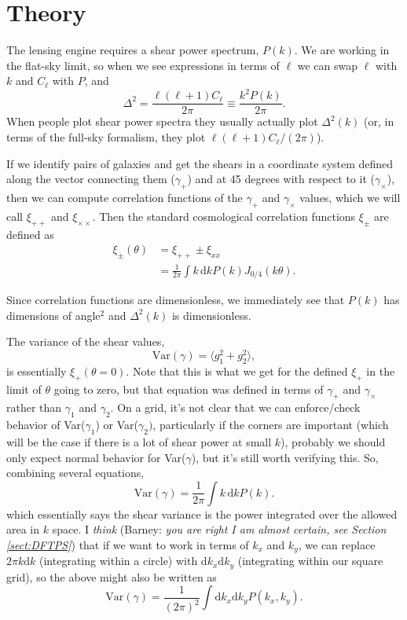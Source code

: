 \documentclass[preprint]{aastex}
\newcommand{\rmd}{\ensuremath{\mathrm{d}}}
\newcommand{\beq}{\begin{equation}}
\newcommand{\eeq}{\end{equation}}
\begin{document}
\section{Theory}\label{sect:theory}

The lensing engine requires a shear power spectrum, $P(k)$.  We are
working in the flat-sky limit, so when we see expressions in terms of
$\ell$ we can swap $\ell$ with $k$ and $C_\ell$ with $P$, and
\beq
\Delta^2 = \frac{\ell(\ell+1) C_{\ell}}{2\pi}\equiv \frac{k^2 P(k)}{2\pi}.
\eeq
When people plot shear power spectra they usually actually plot
$\Delta^2(k)$ (or, in terms of the full-sky formalism, they plot $\ell(\ell+1)C_\ell/(2\pi)$).

If we identify pairs of galaxies and get the shears in a coordinate
system defined along the vector connecting them ($\gamma_+$) and at 45
degrees with respect to it ($\gamma_\times$), then we can compute
correlation functions of the $\gamma_+$ and $\gamma_\times$ values,
which we will call $\xi_{++}$ and $\xi_{\times\times}$.  Then the
standard cosmological correlation functions $\xi_{\pm}$ are defined as
\begin{align}
\xi_{\pm}(\theta) &=  \xi_{++}\pm \xi_{xx} \\
 &= \frac{1}{2\pi}\int k\,\rmd k P(k) J_{0/4}(k\theta).  \label{eq:xi}
\end{align}

Since correlation functions are dimensionless, we immediately see that
$P(k)$ has dimensions of angle$^2$ and $\Delta^2(k)$ is dimensionless.

The variance of the shear values, 
\beq
\mathrm{Var}(\gamma) = \langle g_1^2 + g_2^2\rangle,
\eeq
is essentially $\xi_+(\theta=0)$.   Note that this is what we get for
the defined $\xi_+$ in the limit of $\theta$ going to zero, but that
equation was defined in terms of $\gamma_+$ and $\gamma_\times$ rather
than $\gamma_1$ and $\gamma_2$.  On a grid, it's not clear that we
can enforce/check behavior of Var($\gamma_1$) or Var($\gamma_2)$,
particularly if the corners are important (which will be the case if
there is a lot of shear power at small $k$), probably we should 
 only expect normal behavior for Var($\gamma$), but it's still worth
 verifying this.  So, combining several equations,
\beq\label{E:shearvar}
\mathrm{Var}(\gamma) = \frac{1}{2\pi}\int k\,\rmd k P(k).
\eeq
which essentially says the shear variance is the power integrated over
the allowed area in $k$ space.  I {\em think} (Barney: \emph{you are
  right I am almost certain, see Section \ref{sect:DFTPS}}) that if we want to work
in terms of $k_x$ and $k_y$, we can replace $2\pi k\rmd k$
(integrating within a circle) with $\rmd
k_x \rmd k_y$ (integrating within our square grid), so the above might also be
written as
\beq\label{E:alt-shearvar}
\mathrm{Var}(\gamma) = \frac{1}{(2\pi)^2} \int \rmd k_x \rmd k_y
P(k_x, k_y).
\eeq
\end{document}
